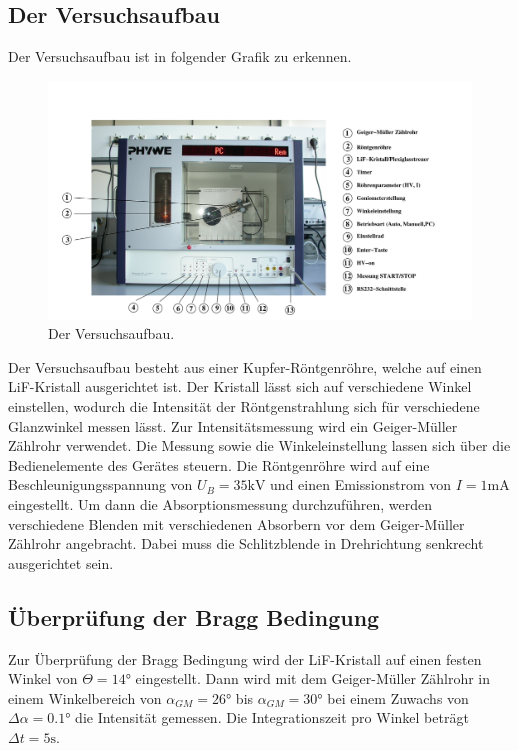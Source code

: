 \subsection{Der Versuchsaufbau}
\label{sec:Versuchsaufbau}
Der Versuchsaufbau ist in folgender Grafik zu erkennen.
\begin{figure}[H]
  \centering
  \includegraphics[scale=0.4]{"content/aufbau.png"}
  \caption{Der Versuchsaufbau. \cite{AP01}}
  \label{fig:aufbaudurchführung}
\end{figure}
\noindent
Der Versuchsaufbau besteht aus einer Kupfer-Röntgenröhre, welche auf einen LiF-Kristall
ausgerichtet ist. Der Kristall lässt sich auf verschiedene Winkel einstellen,
wodurch die Intensität der Röntgenstrahlung sich für verschiedene Glanzwinkel
messen lässt. Zur Intensitätsmessung wird ein Geiger-Müller Zählrohr verwendet.
Die Messung sowie die Winkeleinstellung lassen sich über die Bedienelemente des
Gerätes steuern. Die Röntgenröhre wird auf eine Beschleunigungsspannung von
$U_B = 35 \si{\kilo\volt}$ und einen Emissionstrom von $I = 1 \si{\milli\ampere}$
eingestellt. Um dann die Absorptionsmessung durchzuführen, werden verschiedene
Blenden mit verschiedenen Absorbern vor dem Geiger-Müller Zählrohr angebracht.
Dabei muss die Schlitzblende in Drehrichtung senkrecht ausgerichtet sein.

\subsection{Überprüfung der Bragg Bedingung}
Zur Überprüfung der Bragg Bedingung wird der LiF-Kristall auf einen festen Winkel
von $\Theta = 14 \si{\degree}$ eingestellt. Dann wird mit dem Geiger-Müller Zählrohr
in einem Winkelbereich von $\alpha_{GM} = 26 \si{\degree}$ bis $\alpha_{GM} = 30 \si{\degree}$
bei einem Zuwachs von $\Delta \alpha = 0.1 \si{\degree}$ die Intensität gemessen.
Die Integrationszeit pro Winkel beträgt $\Delta t = 5 \si{\second}$.

